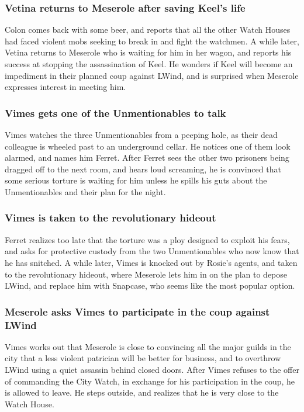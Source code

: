 \subsubsection{\Gls{Vetina} returns to \Gls{Meserole} after saving \Gls{Keel}'s life}
\Gls{Colon} comes back with some beer, and reports that all the other Watch Houses had faced violent
mobs seeking to break in and fight the watchmen. A while later, \Gls{Vetina} returns to
\Gls{Meserole} who is waiting for him in her wagon, and reports his success at stopping the
assassination of \Gls{Keel}. He wonders if \Gls{Keel} will become an impediment in their planned
coup against \Gls{LWind}, and is surprised when \Gls{Meserole} expresses interest in meeting him.

\subsubsection{\Gls{Vimes} gets one of the Unmentionables to talk}
\Gls{Vimes} watches the three Unmentionables from a peeping hole, as their dead colleague is
wheeled past to an underground cellar. He notices one of them look alarmed, and names him
\Gls{Ferret}. After \Gls{Ferret} sees the other two prisoners being dragged off to the next room,
and hears loud screaming, he is convinced that some serious torture is waiting for him unless he
spills his guts about the Unmentionables and their plan for the night.

\subsubsection{\Gls{Vimes} is taken to the revolutionary hideout}
\Gls{Ferret} realizes too late that the torture was a ploy designed to exploit his fears, and asks
for protective custody from the two Unmentionables who now know that he has snitched. A while later,
\Gls{Vimes} is knocked out by \Gls{Rosie}'s agents, and taken to the revolutionary hideout, where
\Gls{Meserole} lets him in on the plan to depose \Gls{LWind}, and replace him with \Gls{Snapcase},
who seems like the most popular option.

\subsubsection{\Gls{Meserole} asks \Gls{Vimes} to participate in the coup against \Gls{LWind}}
\Gls{Vimes} works out that \Gls{Meserole} is close to convincing all the major guilds in the city
that a less violent patrician will be better for business, and to overthrow \Gls{LWind} using a
quiet assassin behind closed doors. After \Gls{Vimes} refuses to the offer of commanding the City
Watch, in exchange for his participation in the coup, he is allowed to leave. He steps outside, and
realizes that he is very close to the Watch House.

